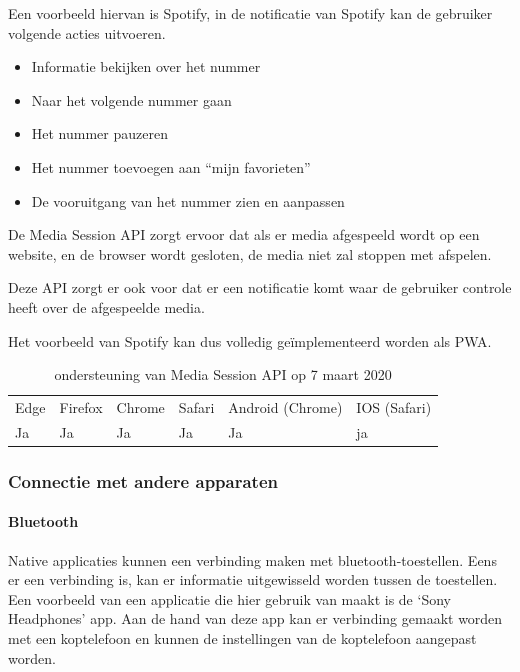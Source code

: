 Een voorbeeld hiervan is Spotify, in de notificatie van Spotify kan de gebruiker volgende acties uitvoeren.
 \begin{itemize}
   \item	Informatie bekijken over het nummer
   \item	Naar het volgende nummer gaan
   \item	Het nummer pauzeren
   \item	Het nummer toevoegen aan “mijn favorieten”
   \item	De vooruitgang van het nummer zien en aanpassen
\end{itemize}
De Media Session API \autocite{Beaufort2019} zorgt ervoor dat als er media afgespeeld wordt op een website, en de browser wordt gesloten, de media niet zal stoppen met afspelen.

Deze API zorgt er ook voor dat er een notificatie komt waar de gebruiker controle heeft over de afgespeelde media. 

Het voorbeeld van Spotify kan dus volledig geïmplementeerd worden als PWA.

\begin{table}[H]
	\centering
	\begin{tabular}{llllll}
		Edge & Firefox & Chrome & Safari & Android (Chrome) & IOS (Safari) \\
		Ja   & Ja      & Ja     & Ja     & Ja               & ja          
	\end{tabular}	
	\caption{ondersteuning van Media Session API op 7 maart 2020}
\end{table}



\subsubsection{Connectie met andere apparaten}



\paragraph{Bluetooth }

Native applicaties kunnen een verbinding maken met bluetooth-toestellen. Eens er een verbinding is, kan er informatie uitgewisseld worden tussen de toestellen. Een voorbeeld van een applicatie die hier gebruik van maakt is de ‘Sony Headphones’ app. Aan de hand van deze app kan er verbinding gemaakt worden met een koptelefoon en kunnen de instellingen van de koptelefoon aangepast worden.


